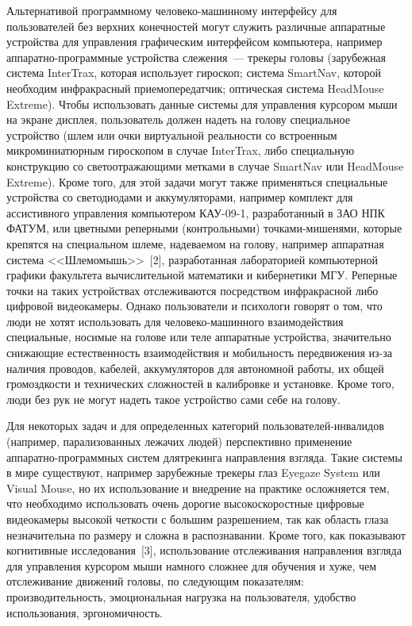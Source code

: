 \begin{multicols}{2}
  Альтернативой программному человеко-ма\-шин\-но\-му интерфейсу для 
пользователей без верхних конечностей могут служить различные аппа\-ратные 
устройства для управления графическим интерфей\-сом компьютера, например 
ап\-па\-рат\-но-про\-грам\-мные устройства слежения~--- трекеры головы (зарубежная 
сис\-те\-ма InterTrax, которая использует гироскоп; сис\-те\-ма SmartNav, которой 
\mbox{необходим} инфракрасный приемопередатчик; оптическая сис\-те\-ма HeadMouse 
Extreme). Чтобы использовать данные системы для управления курсором мыши 
на экране дисплея, пользователь должен надеть на голову специальное 
устройство (шлем или очки виртуальной реальности со встроенным 
микроминиатюрным гироскопом в случае InterTrax, либо специальную 
конструкцию со светоотражающими метками в случае SmartNav или 
HeadMouse Extreme). Кроме того, для этой задачи могут также применяться 
специальные устройства со светодиодами и аккумуляторами, например 
комплект для ассистивного управления компьютером КАУ-09-1, 
разработанный в ЗАО НПК ФАТУМ, или цветными реперными 
(контрольными) точками-мишенями, которые крепятся на специальном шлеме, 
на\-де\-ва\-емом на голову, например аппаратная система <<Шлемомышь>>~[2], 
разработанная лабораторией компьютерной графики факультета 
вычислительной математики и кибернетики МГУ. Реперные точки на таких 
устройствах отслеживаются посредством инфракрасной либо цифровой 
видеокамеры. Однако пользователи и психологи говорят о том, что люди не 
хотят использовать для человеко-машинного взаимодействия специальные, 
носимые на голове или теле аппаратные устройства, значительно снижающие 
естественность взаимодействия и мобильность передвижения из-за наличия 
проводов, кабелей, аккумуляторов для автономной работы, их общей 
громоздкости и технических сложностей в калибровке и установке. Кроме того, 
люди без рук не могут надеть такое устройство сами себе на голову.
  
  Для некоторых задач и для определенных категорий 
  пользователей-инвалидов (например, парализованных лежачих людей) 
перспективно применение аппаратно-программных систем для\linebreak трекинга 
направления взгляда. Такие системы в мире существуют, например зарубежные 
трекеры глаз Eyegaze System или Visual Mouse, но их использование и 
внедрение на практике осложняется тем, что необходимо использовать очень 
дорогие высокоскоростные цифровые видеокамеры высокой четкости с 
большим разрешением, так как область глаза незначительна по размеру и 
сложна в распознавании. Кроме того, как показывают когнитивные 
исследования~[3], использование отслеживания направления взгляда для 
управления курсором мыши намного сложнее для обучения и хуже, чем 
отслеживание движений головы, по следующим показателям: 
производительность, эмоциональная нагрузка на пользователя, удобство 
использования, эргономичность.
  

\end{multicols}

